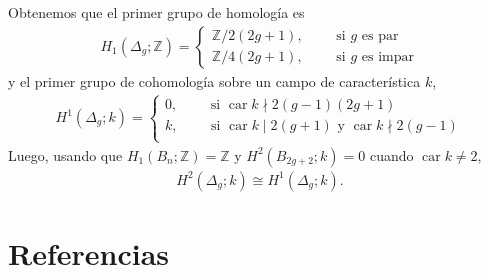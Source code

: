 \documentclass[spanish]{article}
\theoremstyle{definition}
\newcommand{\Z}{\mathbb{Z}}
\newcommand{\C}{\mathbb{C}}
\DeclareMathOperator{\Mod}{Mod}
\begin{document}
Obtenemos que el primer grupo de homología es
\begin{align*}
	H_1(\Delta_g;\Z)=\begin{cases}
		\Z/2(2g+1),\qquad\text{ si }g\text{ es par}\\
		\Z/4(2g+1),\qquad\text{ si }g\text{ es impar}
	\end{cases}
\end{align*}
y el primer grupo de cohomología sobre un campo de característica $k$,
\begin{align*}
	H^1(\Delta_g;k)=\begin{cases}
		0,\qquad\text{ si }\operatorname{car}k\nmid 2(g-1)(2g+1)\\
		k,\qquad\text{ si }\operatorname{car}k\mid 2(g+1) \text{ y }\operatorname{car}k\nmid 2(g-1)\\
	\end{cases}
\end{align*}
Luego, usando que $H_1(B_n;\Z)=\Z$ y $H^2(B_{2g+2};k)=0$ cuando $\operatorname{car}k\neq2$,
\begin{align*}
	H^2(\Delta_g;k)\cong H^1(\Delta_g;k).
\end{align*}

\section{Referencias}
\printbibliography[heading=none]
\end{document}
